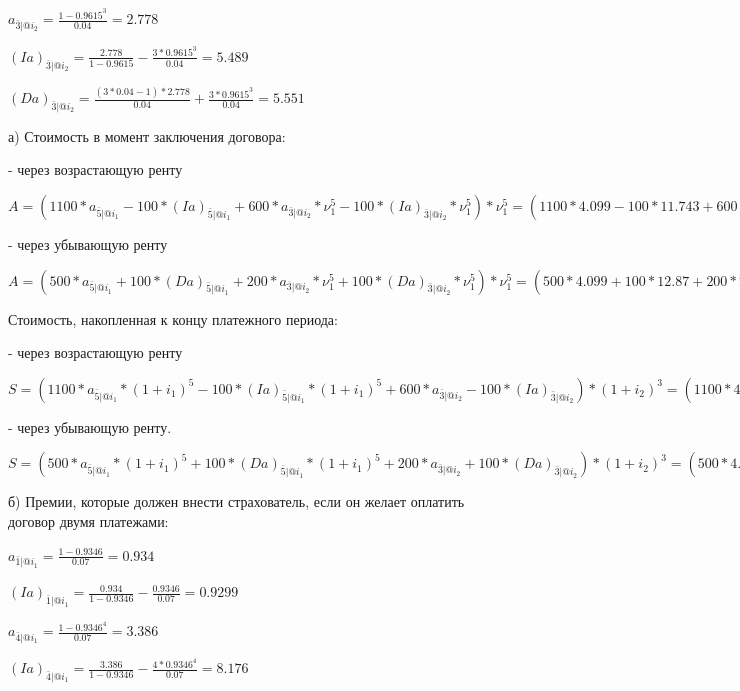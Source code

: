 \documentclass[12pt,a4paper, oneside]{extreport}
\begin{document}
$a_{\bar{3}|@i_2} = \frac{1-0.9615^3}{0.04}=2.778$

$(Ia)_{\bar{3}|@i_2} = \frac{2.778}{1-0.9615}-\frac{3*0.9615^3}{0.04}=5.489$


$(Da)_{\bar{3}|@i_2} = \frac{(3*0.04-1)*2.778}{0.04}+\frac{3*0.9615^3}{0.04}=5.551$


а) Стоимость в момент заключения договора: 

- через возрастающую ренту 

$A = (1100 * a_{\bar{5}|@i_1} - 100 * (Ia)_{\bar{5}|@i_1}     +  600 * a_{\bar{3}|@i_2} * \nu_1^5   - 100 * (Ia)_{\bar{3}|@i_2}* \nu_1^5   )*\nu_1^5 = 
     (1100 * 4.099 - 100 * 11.743     +  600 * 2.778 * 0.9346^5   - 100 * 5.489* 0.9346^5   )*0.9346^5   = 2946.194$  

- через убывающую ренту

$A = (500 * a_{\bar{5}|@i_1} + 100 * (Da)_{\bar{5}|@i_1}     +  200 * a_{\bar{3}|@i_2} * \nu_1^5   + 100 * (Da)_{\bar{3}|@i_2}* \nu_1^5   )*\nu_1^5 = 
      (500 * 4.099 + 100 * 12.87     +  200 * 2.778 * 0.9346^5   + 100 * 5.551* 0.9346^5   )*0.9346^5 = 2943.888 $  


Стоимость, накопленная  к концу платежного периода: 

- через возрастающую ренту 

$S = (1100 * a_{\bar{5}|@i_1}*(1+i_1)^5 - 100 * (Ia)_{\bar{5}|@i_1} *(1+i_1)^5     +  600 * a_{\bar{3}|@i_2}     - 100 * (Ia)_{\bar{3}|@i_2}   )*(1+i_2)^3  
= (1100 * 4.099*1.07^5 - 100 * 11.743 * 1.07^5     +  600 * 2.778     - 100 * 5.489   )*1.04^3 = 6518.417 $
  


- через убывающую ренту.

$S = (500 * a_{\bar{5}|@i_1} *(1+i_1)^5 + 100 * (Da)_{\bar{5}|@i_1} *(1+i_1)^5    +  200 * a_{\bar{3}|@i_2}    + 100 * (Da)_{\bar{3}|@i_2}   )*(1+i_2)^3  = (500 * 4.099 *1.07^5 + 100 * 12.87 *1.07^5    +  200 * 2.778    + 100 * 5.551  )*1.04^3 = 6513.316$  



б) Премии, которые  должен внести страхователь, если он желает
оплатить договор двумя платежами:


$a_{\bar{1}|@i_1} = \frac{1-0.9346}{0.07}=0.934$

$(Ia)_{\bar{1}|@i_1} = \frac{0.934}{1-0.9346}-\frac{0.9346}{0.07}=0.9299$

$a_{\bar{4}|@i_1} = \frac{1-0.9346^4}{0.07}=3.386$

$(Ia)_{\bar{4}|@i_1} = \frac{3.386}{1-0.9346}-\frac{4*0.9346^4}{0.07}=8.176$
\end{document}
